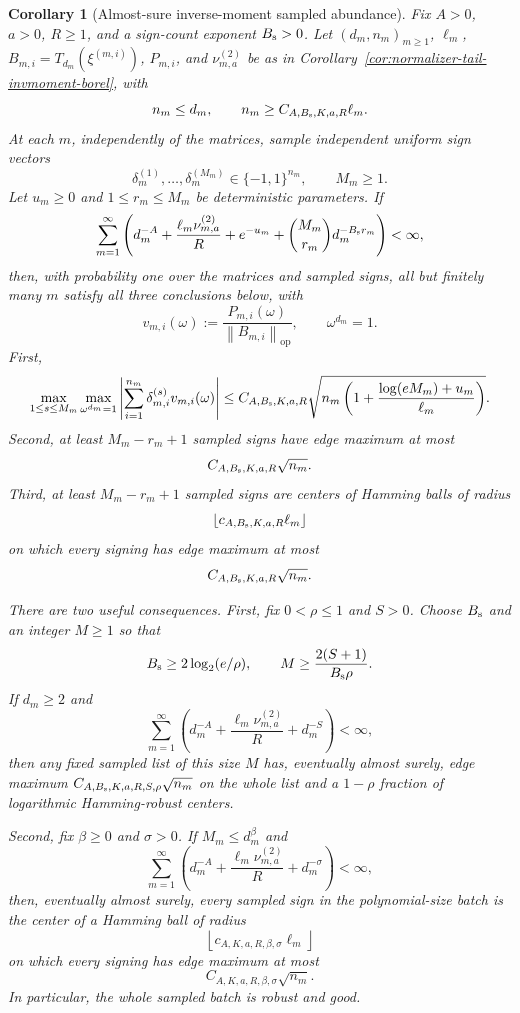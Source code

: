\documentclass[11pt]{amsart}
\numberwithin{equation}{section}
\newtheorem{corollary}[theorem]{Corollary}
\theoremstyle{definition}
\theoremstyle{remark}
\newcommand{\op}{\mathrm{op}}
\newcommand{\norm}[1]{\left\lVert #1\right\rVert}
\begin{document}
\begin{corollary}[Almost-sure inverse-moment sampled abundance]
\label{cor:normalizer-tail-invmoment-borel-abundance}
Fix \(A>0\), \(a>0\), \(R\ge1\), and a sign-count exponent
\(B_{\rm s}>0\).  Let \((d_m,n_m)_{m\ge1}\), \(\ell_m\),
\(B_{m,i}=T_{d_m}(\xi^{(m,i)})\), \(P_{m,i}\), and
\(\nu_{m,a}^{(2)}\) be as in
Corollary~\ref{cor:normalizer-tail-invmoment-borel}, with
\[
  n_m\le d_m,\qquad
  n_m\ge C_{A,B_{\rm s},K,a,R}\ell_m .
\]
At each \(m\), independently of the matrices, sample independent uniform sign
vectors
\[
  \delta_m^{(1)},\ldots,\delta_m^{(M_m)}\in\{-1,1\}^{n_m},
  \qquad M_m\ge1.
\]
Let \(u_m\ge0\) and \(1\le r_m\le M_m\) be deterministic parameters.  If
\[
  \sum_{m=1}^{\infty}
  \left(
  d_m^{-A}+\frac{\ell_m\nu_{m,a}^{(2)}}{R}
  +e^{-u_m}+\binom{M_m}{r_m}d_m^{-B_{\rm s}r_m}
  \right)<\infty,
\]
then, with probability one over the matrices and sampled signs, all but
finitely many \(m\) satisfy all three conclusions below, with
\[
  v_{m,i}(\omega):=
  \frac{P_{m,i}(\omega)}{\norm{B_{m,i}}_{\op}},
  \qquad \omega^{d_m}=1.
\]
First,
\[
\begin{aligned}
  \max_{1\le s\le M_m}\max_{\omega^{d_m}=1}
  \left|\sum_{i=1}^{n_m}\delta_{m,i}^{(s)}v_{m,i}(\omega)\right|
  \le
  C_{A,B_{\rm s},K,a,R}
  \sqrt{n_m\left(1+\frac{\log(eM_m)+u_m}{\ell_m}\right)} .
\end{aligned}
\]
Second, at least \(M_m-r_m+1\) sampled signs have edge maximum at most
\[
  C_{A,B_{\rm s},K,a,R}\sqrt{n_m}.
\]
Third, at least \(M_m-r_m+1\) sampled signs are centers of Hamming balls of
radius
\[
  \left\lfloor c_{A,B_{\rm s},K,a,R}\ell_m\right\rfloor
\]
on which every signing has edge maximum at most
\[
  C_{A,B_{\rm s},K,a,R}\sqrt{n_m}.
\]

There are two useful consequences.  First, fix \(0<\rho\le1\) and \(S>0\).
Choose \(B_{\rm s}\) and an integer \(M\ge1\) so that
\[
  B_{\rm s}\ge2\log_2(e/\rho),
  \qquad
  M\ge \frac{2(S+1)}{B_{\rm s}\rho}.
\]
If \(d_m\ge2\) and
\[
  \sum_{m=1}^{\infty}
  \left(d_m^{-A}+\frac{\ell_m\nu_{m,a}^{(2)}}{R}+d_m^{-S}\right)<\infty,
\]
then any fixed sampled list of this size \(M\) has, eventually almost surely,
edge maximum \(C_{A,B_{\rm s},K,a,R,S,\rho}\sqrt{n_m}\) on the whole list and a
\(1-\rho\) fraction of logarithmic Hamming-robust centers.

Second, fix \(\beta\ge0\) and \(\sigma>0\).  If \(M_m\le d_m^\beta\) and
\[
  \sum_{m=1}^{\infty}
  \left(d_m^{-A}+\frac{\ell_m\nu_{m,a}^{(2)}}{R}+d_m^{-\sigma}\right)<\infty,
\]
then, eventually almost surely, every sampled sign in the polynomial-size batch
is the center of a Hamming ball of radius
\[
  \left\lfloor c_{A,K,a,R,\beta,\sigma}\ell_m\right\rfloor
\]
on which every signing has edge maximum at most
\[
  C_{A,K,a,R,\beta,\sigma}\sqrt{n_m}.
\]
In particular, the whole sampled batch is robust and good.


\end{corollary}
\end{document}

